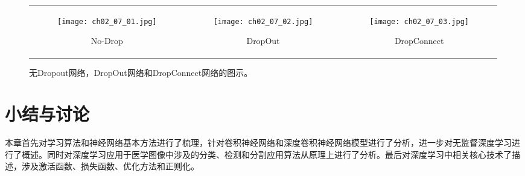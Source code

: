 \begin{figure}
	\centering
	\begin{tabular}[c]{ccc}
		\begin{subfigure}[c]{0.27\textwidth}
			\texttt{[image: ch02\_07\_01.jpg]}
			\caption{No-Drop}
			\label{fig:nodrop}
		\end{subfigure}&
		\begin{subfigure}[c]{0.27\textwidth}
			\texttt{[image: ch02\_07\_02.jpg]}
			\caption{DropOut}
			\label{fig:dropout}
		\end{subfigure}&
		\begin{subfigure}[c]{0.27\textwidth}
			\texttt{[image: ch02\_07\_03.jpg]}
			\caption{DropConnect}
			\label{fig:dropconnect}	
		\end{subfigure}			
	\end{tabular}    
	\caption{无Dropout网络，DropOut网络和DropConnect网络的图示。}
	\label{fig:CNN_DropConnect}
\end{figure}

\section{小结与讨论}

本章首先对学习算法和神经网络基本方法进行了梳理，针对卷积神经网络和深度卷积神经网络模型进行了分析，进一步对无监督深度学习进行了概述。同时对深度学习应用于医学图像中涉及的分类、检测和分割应用算法从原理上进行了分析。最后对深度学习中相关核心技术了描述，涉及激活函数、损失函数、优化方法和正则化。 